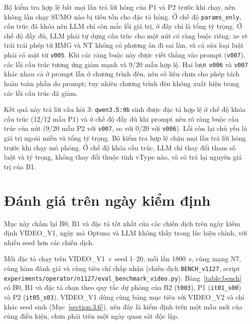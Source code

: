 \documentclass[../main.tex]{subfiles}
\begin{document}
Bộ kiểm tra hợp lệ bắt mọi lần trả lời hỏng của P1 và P2 trước khi chạy, nên không lần chạy SUMO nào bị tiêu tốn cho đặc tả hỏng. Ở chế độ \texttt{params\_only}, cấu trúc đã khóa nên LLM chỉ còn mắc lỗi giá trị, ở đây chỉ là tổng tỷ trọng. Ở chế độ đầy đủ, LLM phải tự dựng cấu trúc cho một nút có ràng buộc riêng: xe rẽ trái trái phép từ HMG và NT không có phương án đi sai làn, và cả sáu loại luật phải có mặt từ \texttt{v005}. Khi các ràng buộc này được viết thẳng vào prompt (\texttt{v007}), các lỗi cấu trúc tương ứng giảm mạnh và 9/20 mẫu hợp lệ. Hai lượt \texttt{v006} và \texttt{v007} khác nhau cả ở prompt lẫn ở chương trình đèn, nên số liệu chưa cho phép tách hoàn toàn phần do prompt; tuy nhiên chương trình đèn không xuất hiện trong các lỗi cấu trúc đã giảm.

Kết quả này trả lời câu hỏi 3: \texttt{qwen3.5:9b} sinh được đặc tả hợp lệ ở chế độ khóa cấu trúc (12/12 mẫu P1) và ở chế độ đầy đủ khi prompt nêu rõ ràng buộc cấu trúc của nút (9/20 mẫu P2 với \texttt{v007}, so với 0/20 với \texttt{v006}). Lỗi còn lại chủ yếu là giá trị ngoài miền và tổng tỷ trọng. Bộ kiểm tra hợp lệ chặn mọi lần trả lời hỏng trước khi chạy mô phỏng. Ở chế độ khóa cấu trúc, LLM chỉ thay đổi tham số luật và tỷ trọng, không thay đổi thuộc tính vType nào, và có trả lại nguyên giá trị của B1.

\section{Đánh giá trên ngày kiểm định}
\label{section:benchmark}

Mục này chấm lại B0, B1 và đặc tả tốt nhất của các chiến dịch trên ngày kiểm định VIDEO\_V1, ngày mà Optuna và LLM không thấy trong lúc hiệu chỉnh, với nhiều seed hơn các chiến dịch.

Mỗi đặc tả chạy trên VIDEO\_V1 $\times$ seed 1--20, mỗi lần 1800~s, cùng mạng N7, cùng hàm đánh giá và cùng tiêu chí chấp nhận (chiến dịch \texttt{BENCH\_v1127}, script \texttt{experiments/\allowbreak operator/\allowbreak n1127/\allowbreak eval\_benchmark\_video.py}). Bảng~\ref{table:bench} có B0, B1 và đặc tả chọn theo quy tắc dự phòng của B2 (\texttt{t003}), P1 (\texttt{it01\_s00}) và P2 (\texttt{it05\_s03}). VIDEO\_V1 dùng cùng bảng mục tiêu với VIDEO\_V2 và chỉ khác seed sinh (Mục~\ref{section:3.6}), nên đây là kiểm định trên một mẫu mới của cùng điều kiện, chưa phải trên một ngày quan sát độc lập.
\end{document}

